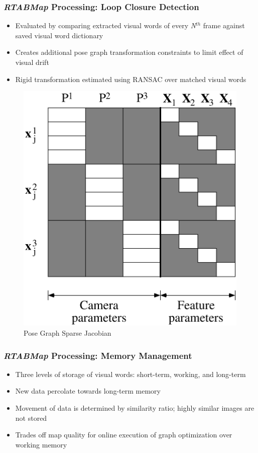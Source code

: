 \documentclass{beamer}
\begin{document}
\begin{frame}
\frametitle{\textit{RTABMap} Processing: Loop Closure Detection}
\begin{itemize}
\item{Evaluated by comparing extracted visual words of every \textit{N}$^{th}$ frame against saved visual word dictionary}
\item{Creates additional pose graph transformation constraints to limit effect of visual drift}
\item{Rigid transformation estimated using RANSAC over matched visual words}
\end{itemize}
\begin{figure}
\includegraphics[width=0.3\linewidth]{figures/appendixfigs-sparse-jacobian}
\caption{Pose Graph Sparse Jacobian}
\end{figure}
\end{frame}

\begin{frame}
\frametitle{\textit{RTABMap} Processing: Memory Management}
\begin{itemize}
\item{Three levels of storage of visual words: short-term, working, and long-term}
\item{New data percolate towards long-term memory}
\item{Movement of data is determined by similarity ratio; highly similar images are not stored}
\item{Trades off map quality for online execution of graph optimization over working memory}
\end{itemize}
\end{frame}
\end{document}
